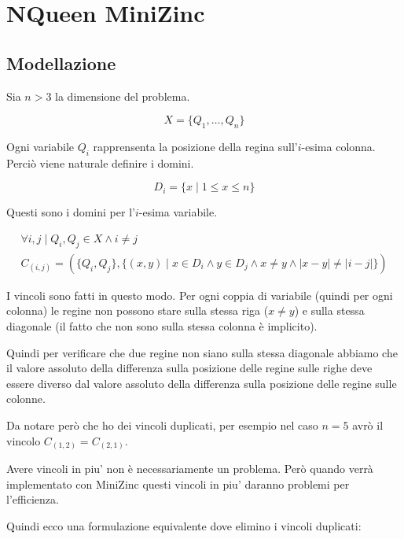\documentclass{article}
\begin{document}
\section{NQueen MiniZinc}

\subsection{Modellazione}

Sia $n > 3$ la dimensione del problema.

\begin{equation}
    X = \{Q_1, \dots, Q_n\}
\end{equation}

Ogni variabile $Q_i$ rapprensenta la posizione della regina
sull'$i$-esima colonna.
Perciò viene naturale definire i domini.

\begin{equation}
    D_i = \{ x \mid 1 \leq x \leq n \}
\end{equation}

Questi sono i domini per l'$i$-esima variabile.

\begin{multline}
    \forall i,j \mid Q_i,Q_j \in X \land i \not = j \quad \\
    C_{(i,j)} = 
    (
        \{Q_i,Q_j\}, \{(x,y) \mid x \in D_i \land y \in D_j \land x \not = y \land |x - y| \not = |i - j|\}
    )
\end{multline}

I vincoli sono fatti in questo modo. Per ogni coppia di variabile (quindi per ogni colonna)
le regine non possono stare sulla stessa riga ($x \not = y$) e sulla stessa diagonale (il fatto che non sono sulla stessa colonna è implicito).

Quindi per verificare che due regine non siano sulla stessa diagonale abbiamo che il valore assoluto della differenza sulla posizione delle regine sulle righe deve essere diverso dal valore assoluto della
differenza sulla posizione delle regine sulle colonne.

Da notare però che ho dei vincoli duplicati, per esempio nel caso $n = 5$ avrò il vincolo $C_{(1,2)} = C_{(2,1)}$.

Avere vincoli in piu' non è necessariamente un problema.
Però quando verrà implementato con MiniZinc questi vincoli in piu' daranno problemi per l'efficienza.

Quindi ecco una formulazione equivalente dove elimino i vincoli duplicati:
\end{document}
